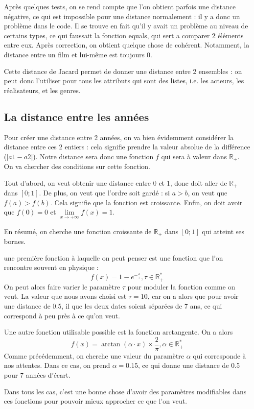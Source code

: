 \documentclass{report}
\begin{document}
Après quelques tests, on se rend compte que l'on obtient parfois une distance négative, ce qui est impossible pour une distance normalement : il y a donc un problème dans le code. Il se trouve en fait qu'il y avait un problème au niveau de certains types, ce qui faussait la fonction equals, qui sert a comparer 2 éléments entre eux. Après correction, on obtient quelque chose de cohérent. Notamment, la distance entre un film et lui-même est toujours 0.\par
Cette distance de Jacard permet de donner une distance entre 2 ensembles : on peut donc l'utiliser pour tous les attributs qui sont des listes, i.e. les acteurs, les réalisateurs, et les genres.

\subsection{La distance entre les années}
Pour créer une distance entre 2 années, on va bien évidemment considérer la distance entre ces 2 entiers : cela signifie prendre la valeur absolue de la différence (\(|a1-a2|\)). Notre distance sera donc une fonction $f$ qui sera à valeur dans $\mathds{R}_{+}$. On va chercher des conditions sur cette fonction.\par
Tout d'abord, on veut obtenir une distance entre 0 et 1, donc doit aller de $\mathds{R}_{+}$ dans \([0;1]\). De plus, on veut que l'ordre soit gardé : si \(a>b\), on veut que \(f(a)>f(b)\). Cela signifie que la fonction est croissante. Enfin, on doit avoir que $f(0)=0$ et $\lim\limits_{x \rightarrow +\infty} f(x)=1$.\par
En résumé, on cherche une fonction croissante de $\mathds{R}_{+}$ dans $[0;1]$ qui atteint ses bornes.\par
une première fonction à laquelle on peut penser est une fonction que l'on rencontre souvent en physique :
\[f(x)=1-e^{-\frac{x}{\tau}} , \tau \in \mathds{R}_{+}^{*}\]
On peut alors faire varier le paramètre $\tau$ pour moduler la fonction comme on veut. La valeur que nous avons choisi est $\tau=10$, car on a alors que pour avoir une distance de 0.5, il que les deux dates soient séparées de 7 ans, ce qui correspond à peu près à ce qu'on veut.\par
Une autre fonction utilisable possible est la fonction arctangente. On a alors
\[f(x)=\arctan(\alpha \cdot x)\times \frac{2}{\pi} , \alpha \in \mathds{R}_{+}^{*}\]
Comme précédemment, on cherche une valeur du paramètre $\alpha$ qui corresponde à nos attentes. Dans ce cas, on prend $\alpha=0.15$, ce qui donne une distance de 0.5 pour 7 années d'écart.\par
Dans tous les cas, c'est une bonne chose d'avoir des paramètres modifiables dans ces fonctions pour pouvoir mieux approcher ce que l'on veut.
\end{document}
